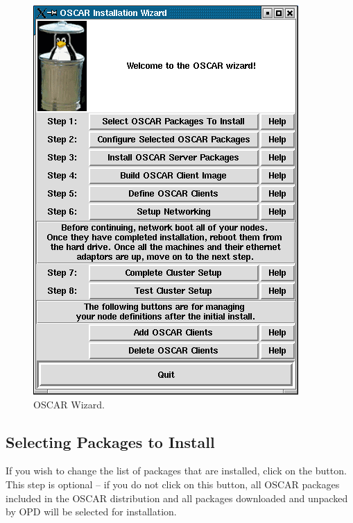 \begin{figure}[htbp]
  \begin{center}
    \includegraphics[scale=\imgscale]{figs/2_sbs-oscar-wizard}
    \caption{OSCAR Wizard.}
    \label{fig:detailed-oscar-wizard}
  \end{center}
\end{figure}
  

\subsection{Selecting Packages to Install}
\label{det:select-packages}

\optional

If you wish to change the list of packages that are installed, click
on the  button.  This step is
optional -- if you do not click on this button, all OSCAR packages
included in the OSCAR distribution and all packages downloaded and
unpacked by OPD will be selected for installation.


